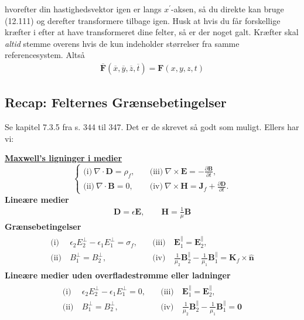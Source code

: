 \documentclass[a4paper]{article}
\begin{document}
    hvorefter din hastighedsvektor igen er langs \(x^{\prime}\)-aksen, så du direkte kan bruge (12.111) og derefter transformere tilbage igen. Husk at hvis du får forskellige kræfter i efter at have transformeret dine felter, så er der noget galt. Kræfter skal \textit{altid} stemme overens hvis de kun indeholder størrelser fra samme referencesystem. Altså \begin{align*}
            \overline{\mathbf{F}}(\overline{x}, \overline{y}, \overline{z}, \overline{t}) = \mathbf{F}(x, y, z, t)
        \end{align*}

    \subsection{Recap: Felternes Grænsebetingelser}
    Se kapitel 7.3.5 fra s. 344 til 347. Det er de skrevet så godt som muligt. Ellers har vi:

    \underline{\textbf{Maxwell's ligninger i medier}}
    \[
    \begin{cases}
    \text{(i)} \ \nabla \cdot \mathbf{D} = \rho _f, \quad & \text{(iii)} \ \nabla \times \mathbf{E} = -\frac{\partial \mathbf{B}}{\partial t}, \\[5pt]
    \text{(ii)} \ \nabla \cdot \mathbf{B} = 0, \quad & \text{(iv)} \ \nabla \times \mathbf{H} = \mathbf{J}_f + \frac{\partial \mathbf{D}}{\partial t}.
    \end{cases}
    \]
    \textbf{Lineære medier}
    \begin{align*}
        \mathbf{D} = \epsilon \mathbf{E}, \qquad \mathbf{H} = \frac{1}{\mu } \mathbf{B}
    \end{align*}
    \textbf{Grænsebetingelser} \begin{align*}
        \begin{aligned}
        \text{(i)} \ & \epsilon_2 E_2^\perp - \epsilon_1 E_1^\perp = \sigma _f, \quad & \text{(iii)} \ & \mathbf{E}_1^\parallel = \mathbf{E}_2^\parallel, \\[5pt]
        \text{(ii)} \ & B_1^\perp = B_2^\perp, \quad & \text{(iv)} \ & \frac{1}{\mu_2} \mathbf{B}_2^\parallel - \frac{1}{\mu_1} \mathbf{B}_1^\parallel = \mathbf{K}_f \times \hat{\mathbf{n}}
        \end{aligned}\tag{7.73}
    \end{align*}
    \textbf{Lineære medier uden overfladestrømme eller ladninger} 
    \begin{align*}
        \begin{aligned}
            \text{(i)} \ & \epsilon_2 E_2^\perp - \epsilon_1 E_1^\perp = 0, \quad & \text{(iii)} \ & \mathbf{E}_1^\parallel = \mathbf{E}_2^\parallel, \\[5pt]
            \text{(ii)} \ & B_1^\perp = B_2^\perp, \quad & \text{(iv)} \ & \frac{1}{\mu_2} \mathbf{B}_2^\parallel - \frac{1}{\mu_1} \mathbf{B}_1^\parallel = \mathbf{0}
            \end{aligned}\tag{7.74}
    \end{align*}
\end{document}
